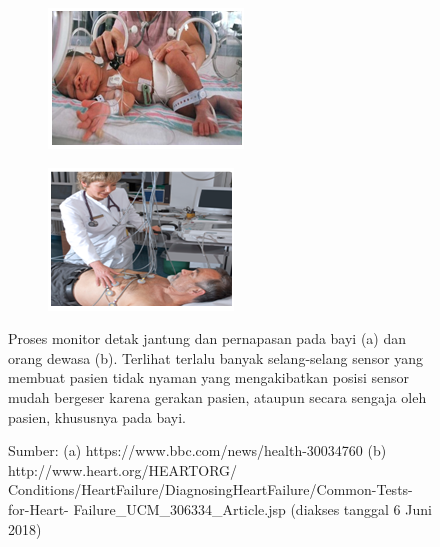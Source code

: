 \begin{figure}[ht]
\vspace{0.5em}
\centering
\begin{subfigure}[b]{0.49\textwidth}
\includegraphics[width=\textwidth]{baby}
\caption{}
\end{subfigure}             
\begin{subfigure}[b]{0.49\textwidth}
\includegraphics[width=\textwidth]{adult}
\caption{}
\end{subfigure}
\caption[Proses monitor detak jantung dan pernapasan pada bayi (a) dan orang dewasa (b)]{Proses monitor detak jantung dan pernapasan pada bayi (a) dan orang dewasa (b). Terlihat terlalu banyak selang-selang sensor yang membuat pasien tidak nyaman yang mengakibatkan posisi sensor mudah bergeser karena gerakan pasien, ataupun secara sengaja oleh pasien, khususnya pada bayi.}
\caption*{Sumber: (a) https://www.bbc.com/news/health-30034760 \citep{Emma} (b) http://www.heart.org/HEARTORG/\\Conditions/HeartFailure/DiagnosingHeartFailure/Common-Tests-for-Heart-
Failure\_UCM\_306334\_Article.jsp \citep{web1} (diakses tanggal 6 Juni 2018)}
\label{fig:pengukuran_jantung}
\end{figure}


